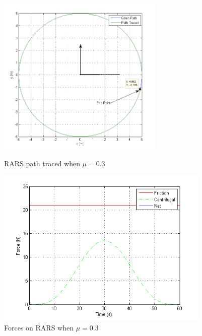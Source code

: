 \begin{figure}
	\begin{minipage}[t]{0.5\textwidth}
		\centering
		\includegraphics[height=3in]{Chapter4/fig/PathWithMu-3slip}
		\caption{RARS path traced when $\mu=0.3$}\label{fig:pathWithMu3}
	\end{minipage}
	\hfill
	\begin{minipage}[t]{0.5\textwidth}
		\centering
		\includegraphics[height=3in,width=\textwidth]{Chapter4/fig/ForceMu-3}
		\caption{Forces on RARS when $\mu=0.3$ }\label{fig:ForcesMu3}
	\end{minipage}
\end{figure}
